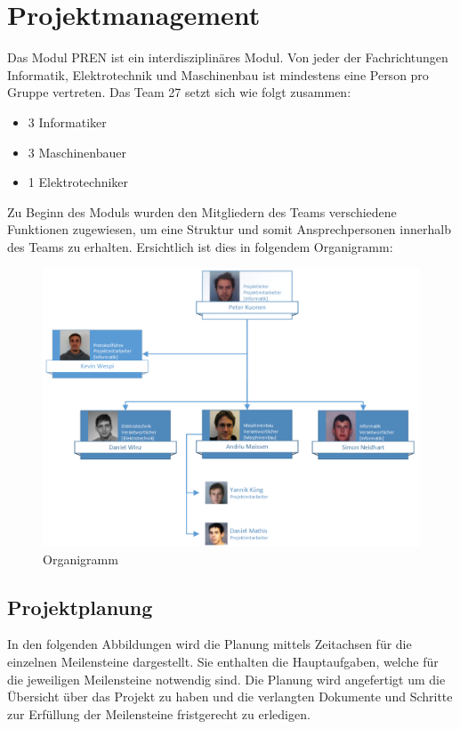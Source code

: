 \section{Projektmanagement}
Das Modul PREN ist ein interdisziplinäres Modul. Von jeder der Fachrichtungen 
Informatik, Elektrotechnik und Maschinenbau ist mindestens eine Person pro 
Gruppe vertreten. Das Team 27 setzt sich wie folgt zusammen:
\begin{itemize}
    \item 3 Informatiker
    \item 3 Maschinenbauer
    \item 1 Elektrotechniker
\end{itemize}
Zu Beginn des Moduls wurden den Mitgliedern des Teams verschiedene Funktionen 
zugewiesen, um eine Struktur und somit Ansprechpersonen innerhalb des Teams zu 
erhalten. Ersichtlich ist dies in folgendem Organigramm:
\begin{figure}[h!]
    \centering
    \includegraphics[width=1.0\textwidth]{fig/Organigramm.png}
    \caption{Organigramm}
    \label{fig:Organigramm}
\end{figure}

\subsection{Projektplanung}
In den folgenden Abbildungen wird die Planung mittels Zeitachsen für die 
einzelnen Meilensteine dargestellt. Sie enthalten die Hauptaufgaben, welche 
für die jeweiligen Meilensteine notwendig sind. Die Planung wird angefertigt 
um die Übersicht über das Projekt zu haben und die verlangten Dokumente und 
Schritte zur Erfüllung der Meilensteine fristgerecht zu erledigen.

